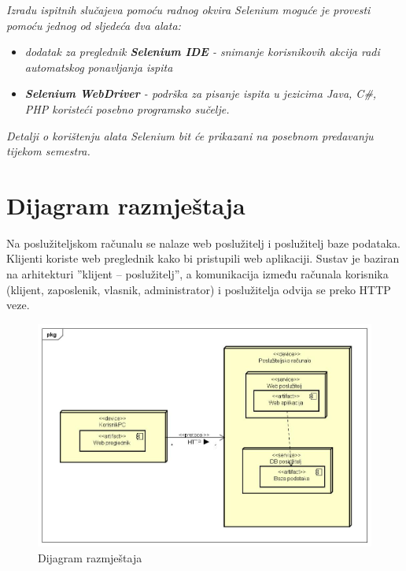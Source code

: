 			 \textit{Izradu ispitnih slučajeva pomoću radnog okvira Selenium moguće je provesti pomoću jednog od sljedeća dva alata:}
			 \begin{itemize}
			 	\item \textit{dodatak za preglednik \textbf{Selenium IDE} - snimanje korisnikovih akcija radi automatskog ponavljanja ispita	}
			 	\item \textit{\textbf{Selenium WebDriver} - podrška za pisanje ispita u jezicima Java, C\#, PHP koristeći posebno programsko sučelje.}
			 \end{itemize}
		 	\textit{Detalji o korištenju alata Selenium bit će prikazani na posebnom predavanju tijekom semestra.}
			
			\eject 
		
		
		\section{Dijagram razmještaja}
			
			

			{ Na poslužiteljskom računalu se nalaze web poslužitelj i poslužitelj baze podataka. Klijenti koriste web
			preglednik kako bi pristupili web aplikaciji. Sustav je baziran na arhitekturi ”klijent – poslužitelj”, a
			komunikacija između računala korisnika (klijent, zaposlenik, vlasnik, administrator) i poslužitelja odvija se preko HTTP veze. }

			\begin{figure}[H]
				\includegraphics[scale=0.3]{slike/Dijagram razmjestaja}
				\centering
				\caption{Dijagram razmještaja}
				\label{fig:razmijestaja}
			\end{figure}

